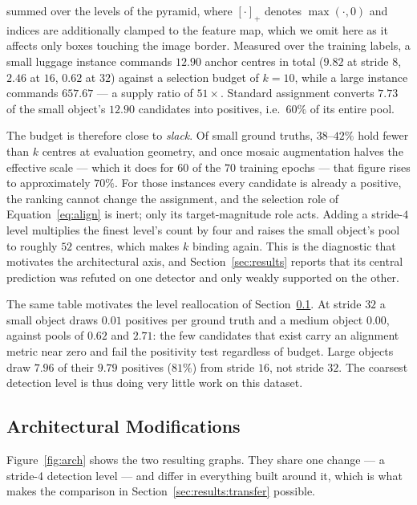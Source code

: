 \documentclass[10pt,twocolumn,a4paper]{article}
\begin{document}
\noindent summed over the levels of the pyramid, where $[\cdot]_+$ denotes
$\max(\cdot,0)$ and indices are additionally clamped to the feature map, which
we omit here as it affects only boxes touching the image border. Measured over the training
labels, a small luggage instance commands $12.90$ anchor centres in total
($9.82$ at stride $8$, $2.46$ at $16$, $0.62$ at $32$) against a selection
budget of $k=10$, while a large instance commands $657.67$ --- a supply ratio of
$51\times$. Standard assignment converts $7.73$ of the small object's $12.90$
candidates into positives, i.e.\ $60\%$ of its entire pool.

The budget is therefore close to \emph{slack}. Of small ground truths,
$38$--$42\%$ hold fewer than $k$ centres at evaluation geometry, and once mosaic
augmentation halves the effective scale --- which it does for $60$ of the $70$
training epochs --- that figure rises to approximately $70\%$. For those
instances every candidate is already a positive, the ranking cannot change the
assignment, and the selection role of Equation~\eqref{eq:align} is inert; only
its target-magnitude role acts. Adding a stride-$4$ level multiplies the finest
level's count by four and raises the small object's pool to roughly $52$
centres, which makes $k$ binding again. This is the diagnostic that motivates
the architectural axis, and Section~\ref{sec:results} reports that its central
prediction was refuted on one detector and only weakly supported on the other.

The same table motivates the level reallocation of
Section~\ref{sec:method:arch}. At stride $32$ a small object draws $0.01$
positives per ground truth and a medium object $0.00$, against pools of $0.62$
and $2.71$: the few candidates that exist carry an alignment metric near zero
and fail the positivity test regardless of budget. Large objects draw $7.96$ of
their $9.79$ positives ($81\%$) from stride $16$, not stride $32$. The coarsest
detection level is thus doing very little work on this dataset.

\subsection{Architectural Modifications}
\label{sec:method:arch}



Figure~\ref{fig:arch} shows the two resulting graphs. They share one change ---
a stride-4 detection level --- and differ in everything built around it, which
is what makes the comparison in Section~\ref{sec:results:transfer} possible.
\end{document}
